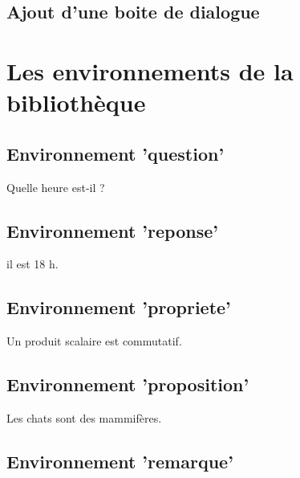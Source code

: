 \subsection{Ajout d'une boite de dialogue}


\section{Les environnements de la bibliothèque}

\subsection{Environnement 'question' }

\begin{question}
Quelle heure est-il ?
\end{question}

\subsection{Environnement 'reponse' }

\begin{reponse}
il est 18 h.
\end{reponse}

\subsection{Environnement 'propriete' }

\begin{propriete}
Un produit scalaire est commutatif.
\end{propriete}

\subsection{Environnement 'proposition' }

\begin{proposition}
Les chats sont des mammifères.
\end{proposition}

\subsection{Environnement 'remarque' }

